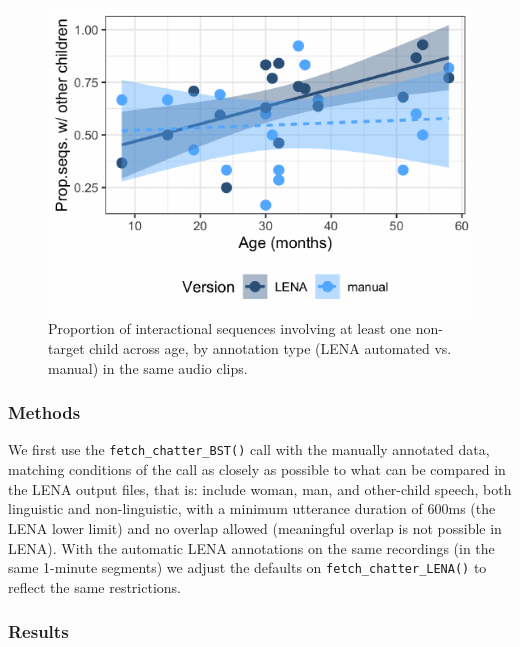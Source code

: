 \documentclass[10pt, letterpaper]{article}
\newenvironment{CodeChunk}{}{}
\begin{document}
\begin{CodeChunk}
\begin{figure}[h!]

{\centering \includegraphics{figs/tsi.is.fig-1} 

}

\caption[Proportion of interactional sequences involving at least one non-target child across age, by annotation type (LENA automated vs]{Proportion of interactional sequences involving at least one non-target child across age, by annotation type (LENA automated vs. manual) in the same audio clips.}\label{fig:tsi.is.fig}
\end{figure}
\end{CodeChunk}

\hypertarget{methods-1}{%
\subsubsection{Methods}\label{methods-1}}

We first use the \texttt{fetch\_chatter\_BST()} call with the manually
annotated data, matching conditions of the call as closely as possible
to what can be compared in the LENA output files, that is: include
woman, man, and other-child speech, both linguistic and non-linguistic,
with a minimum utterance duration of 600ms (the LENA lower limit) and no
overlap allowed (meaningful overlap is not possible in LENA). With the
automatic LENA annotations on the same recordings (in the same 1-minute
segments) we adjust the defaults on \texttt{fetch\_chatter\_LENA()} to
reflect the same restrictions.

\hypertarget{results-1}{%
\subsubsection{Results}\label{results-1}}
\end{document}
